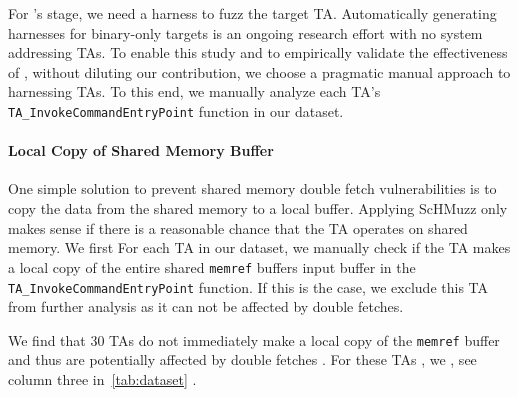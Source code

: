 \documentclass[conference]{IEEEtran} %
\newcommand{\sysname}{ScHMuzz\xspace}
\newcommand{\stageone}{Exploration\xspace}
\newcommand{\numTAsharnessed}{30\xspace}
\providecommand{\DIFaddtex}[1]{{\protect\color{blue} \sf #1}} %
\providecommand{\DIFdeltex}[1]{{\protect\color{red} \scriptsize #1}} %
\providecommand{\DIFaddbegin}{} %
\providecommand{\DIFaddend}{} %
\providecommand{\DIFdelbegin}{} %
\providecommand{\DIFdelend}{} %
\providecommand{\DIFadd}[1]{\texorpdfstring{\DIFaddtex{#1}}{#1}} %
\providecommand{\DIFdel}[1]{\texorpdfstring{\DIFdeltex{#1}}{}} %
\begin{document}
\DIFdelbegin \DIFdel{For }%
\DIFdel{'s }%
\DIFdel{stage, we need a harness to fuzz the target TA. 
Automatically generating harnesses for binary-only targets is an ongoing research effort with no 
system addressing TAs. To enable this study and to empirically validate the 
effectiveness of 
}%
\DIFdel{, without diluting our contribution, we choose a pragmatic manual approach to harnessing TAs.
To this end, we manually analyze each TA's }\texttt{\DIFdel{TA\_InvokeCommandEntryPoint}} %
\DIFdel{function in our dataset. 
}%

\DIFdelend \DIFaddbegin \paragraph{\DIFadd{Local Copy of Shared Memory Buffer}}
\DIFadd{One simple solution to prevent shared memory double fetch vulnerabilities is to copy the 
data from the shared memory to a local buffer. 
}\DIFaddend Applying \sysname only makes sense if there is a reasonable chance that the TA operates on 
shared memory. \DIFdelbegin \DIFdel{We first }\DIFdelend \DIFaddbegin \DIFadd{For each TA in our dataset, we manually }\DIFaddend check if the TA makes a local copy of 
the \DIFaddbegin \DIFadd{entire shared }\DIFaddend \texttt{memref} \DIFdelbegin \DIFdel{buffers }\DIFdelend \DIFaddbegin \DIFadd{input buffer }\DIFaddend in the \texttt{TA\_InvokeCommandEntryPoint} 
function. If this is the case, we exclude this TA from further analysis as it can not be 
affected by double fetches. 

We find that \numTAsharnessed TAs do not immediately make a local copy of the 
\texttt{memref} buffer and thus are potentially affected by double fetches\DIFdelbegin \DIFdel{. For these TAs , we }\DIFdelend \DIFaddbegin \DIFadd{, see column three 
in~}\autoref{tab:dataset}\DIFadd{.
}



\end{document}
